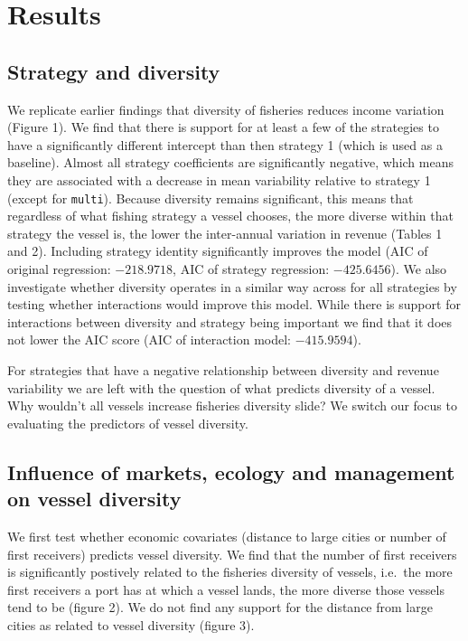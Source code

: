 \documentclass[]{article}
\begin{document}
\section{Results}\label{results}

\subsection{Strategy and diversity}\label{strategy-and-diversity}

We replicate earlier findings that diversity of fisheries reduces income
variation (Figure 1). We find that there is support for at least a few
of the strategies to have a significantly different intercept than then
strategy 1 (which is used as a baseline). Almost all strategy
coefficients are significantly negative, which means they are associated
with a decrease in mean variability relative to strategy 1 (except for
\texttt{multi}). Because diversity remains significant, this means that
regardless of what fishing strategy a vessel chooses, the more diverse
within that strategy the vessel is, the lower the inter-annual variation
in revenue (Tables 1 and 2). Including strategy identity significantly
improves the model (AIC of original regression: \(-218.9718\), AIC of
strategy regression: \(-425.6456\)). We also investigate whether
diversity operates in a similar way across for all strategies by testing
whether interactions would improve this model. While there is support
for interactions between diversity and strategy being important we find
that it does not lower the AIC score (AIC of interaction model:
\(-415.9594\)).

For strategies that have a negative relationship between diversity and
revenue variability we are left with the question of what predicts
diversity of a vessel. Why wouldn't all vessels increase fisheries
diversity slide? We switch our focus to evaluating the predictors of
vessel diversity.

\subsection{Influence of markets, ecology and management on vessel
diversity}\label{influence-of-markets-ecology-and-management-on-vessel-diversity}

We first test whether economic covariates (distance to large cities or
number of first receivers) predicts vessel diversity. We find that the
number of first receivers is significantly postively related to the
fisheries diversity of vessels, i.e.~the more first receivers a port has
at which a vessel lands, the more diverse those vessels tend to be
(figure 2). We do not find any support for the distance from large
cities as related to vessel diversity (figure 3).
\end{document}
